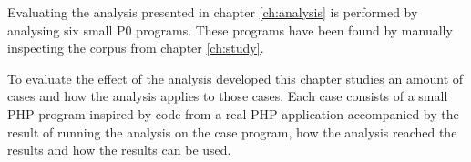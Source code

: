 Evaluating the analysis presented in chapter \ref{ch:analysis} is performed by analysing six small P0 programs. These programs have been found by manually inspecting the corpus from chapter \ref{ch:study}. 



To evaluate the effect of the analysis developed this chapter studies an amount of cases and how the analysis applies to those cases. Each case consists of a small PHP program inspired by code from a real PHP application accompanied by the result of running the analysis on the case program, how the analysis reached the results and how the results can be used.

